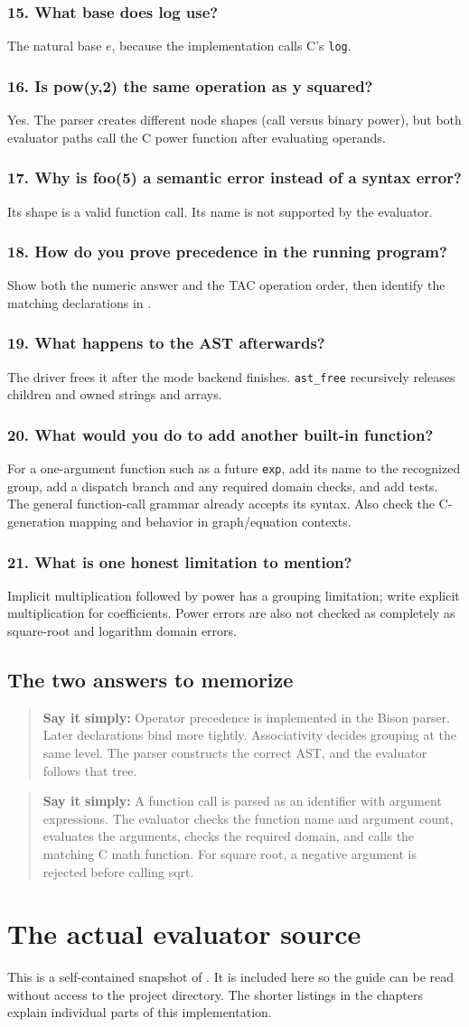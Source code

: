 \documentclass[11pt,a4paper]{report}
\newcommand{\file}[1]{\texttt{\detokenize{#1}}}
\newcommand{\say}[1]{\begin{quote}\textbf{Say it simply:} #1\end{quote}}
\newcommand{\qa}[2]{\subsection*{#1}#2}
\begin{document}
\qa{15. What base does log use?}
The natural base $e$, because the implementation calls C's \texttt{log}.
\qa{16. Is pow(y,2) the same operation as y squared?}
Yes. The parser creates different node shapes (call versus binary power),
but both evaluator paths call the C power function after evaluating operands.
\qa{17. Why is foo(5) a semantic error instead of a syntax error?}
Its shape is a valid function call. Its name is not supported by the evaluator.
\qa{18. How do you prove precedence in the running program?}
Show both the numeric answer and the TAC operation order, then identify the
matching declarations in \file{src/parser.y}.
\qa{19. What happens to the AST afterwards?}
The driver frees it after the mode backend finishes. \texttt{ast\_free}
recursively releases children and owned strings and arrays.
\qa{20. What would you do to add another built-in function?}
For a one-argument function such as a future \texttt{exp}, add its name to the
recognized group, add a dispatch branch and any required domain checks,
and add tests. The general function-call grammar already accepts its syntax.
Also check the C-generation mapping and behavior in graph/equation contexts.
\qa{21. What is one honest limitation to mention?}
Implicit multiplication followed by power has a grouping limitation; write
explicit multiplication for coefficients. Power errors are also not checked
as completely as square-root and logarithm domain errors.

\section*{The two answers to memorize}
\say{Operator precedence is implemented in the Bison parser. Later
declarations bind more tightly. Associativity decides grouping at the same
level. The parser constructs the correct AST, and the evaluator follows that tree.}
\say{A function call is parsed as an identifier with argument expressions.
The evaluator checks the function name and argument count, evaluates the
arguments, checks the required domain, and calls the matching C math function.
For square root, a negative argument is rejected before calling sqrt.}

\appendix
\chapter{The actual evaluator source}
This is a self-contained snapshot of \file{src/eval.c}. It is included here
so the guide can be read without access to the project directory. The shorter
listings in the chapters explain individual parts of this implementation.
\end{document}
